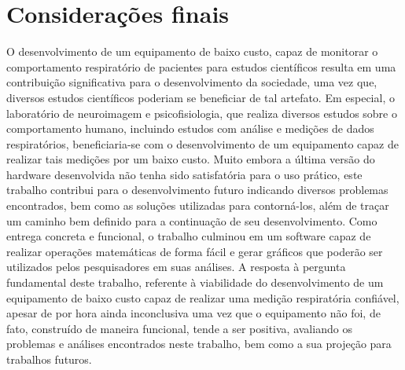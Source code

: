   \section{Considerações finais}
  
  O desenvolvimento de um equipamento de baixo custo, capaz de monitorar o comportamento respiratório de pacientes para estudos científicos resulta em uma contribuição significativa para o desenvolvimento da sociedade, uma vez que, diversos estudos científicos poderiam se beneficiar de tal artefato. Em especial, o laboratório de neuroimagem e psicofisiologia, que realiza diversos estudos sobre o comportamento humano, incluindo estudos com análise e medições de dados respiratórios, beneficiaria-se com o desenvolvimento de um equipamento capaz de realizar tais medições por um baixo custo.  
  Muito embora a última versão do hardware desenvolvida não tenha sido satisfatória para o uso prático, este trabalho contribui para o desenvolvimento futuro indicando diversos problemas encontrados, bem como as soluções utilizadas para contorná-los, além de traçar um caminho bem definido para a continuação de seu desenvolvimento.
  Como entrega concreta e funcional, o trabalho culminou em um software capaz de realizar operações matemáticas de forma fácil e gerar gráficos que poderão ser utilizados pelos pesquisadores em suas análises.
  A resposta à pergunta fundamental deste trabalho, referente à viabilidade do desenvolvimento de um equipamento de baixo custo capaz de realizar uma medição respiratória confiável, apesar de por hora ainda inconclusiva uma vez que o equipamento não foi, de fato, construído de maneira funcional, tende a ser positiva, avaliando os problemas e análises encontrados neste trabalho, bem como a sua projeção para trabalhos futuros.